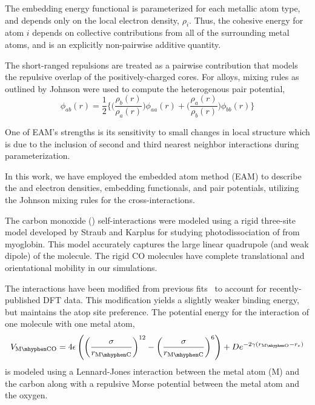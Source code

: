 The embedding energy functional is parameterized for each metallic
atom type, and depends only on the local electron density, $\rho_i$.
Thus, the cohesive energy for atom $i$ depends on collective
contributions from all of the surrounding metal atoms, and is an
explicitly non-pairwise additive quantity.

The short-ranged repulsions are treated as a pairwise contribution
that models the repulsive overlap of the positively-charged cores.
For alloys, mixing rules as outlined by Johnson \citep{Johnson:1989yr} were
used to compute the heterogenous pair potential,
\begin{equation*} 
\phi_{ab}(r) = \frac{1}{2}
\bigg\{ \bigg(
\frac{\rho_b(r)}{\rho_a(r)}
\bigg) \phi_{aa}(r)
+ \bigg(
\frac{\rho_a(r)}{\rho_b(r)}
\bigg)\phi_{bb}(r) 
\bigg\}
\end{equation*} 

One of EAM's strengths is its sensitivity to small changes in local
structure which is due to the inclusion of second and third nearest
neighbor interactions during parameterization.\citep{Voter:1995ax}

In this work, we have employed the embedded atom method (EAM) to
describe the  and  electron densities, embedding
functionals, and pair potentials,\citep{Foiles:1986ky} utilizing the Johnson
mixing rules for the 
cross-interactions.\citep{Johnson:1989yr}

The carbon monoxide () self-interactions were modeled using a
rigid three-site model developed by Straub and Karplus for studying
photodissociation of  from myoglobin.\citep{Straub:1991no} This model
accurately captures the large linear quadrupole (and weak dipole) of
the  molecule. The rigid CO molecules have complete
translational and orientational mobility in our simulations.

The  interactions have been modified from previous
fits~\citep{Michalka:2013aa} to account for recently-published DFT
data.\citep{Deshlahra:2012aa} This modification yields a slightly weaker
 binding energy, but maintains the atop site
preference.  The potential energy for the interaction of one 
molecule with one metal atom,
\begin{equation*}
V_\mathrm{M\mhyphen CO} = 4 \epsilon \left(
  \left(\frac{\sigma}{r_\mathrm{M\mhyphen C}}\right)^{12} -
  \left(\frac{\sigma}{r_\mathrm{M\mhyphen C}}\right)^6 \right) +
D e^{-2 \gamma (r_\mathrm{M\mhyphen O} - r_e)}
\label{eq:pot}
\end{equation*}
is modeled using a Lennard-Jones interaction between the metal atom
(M) and the carbon along with a repulsive Morse potential between the
metal atom and the oxygen.

